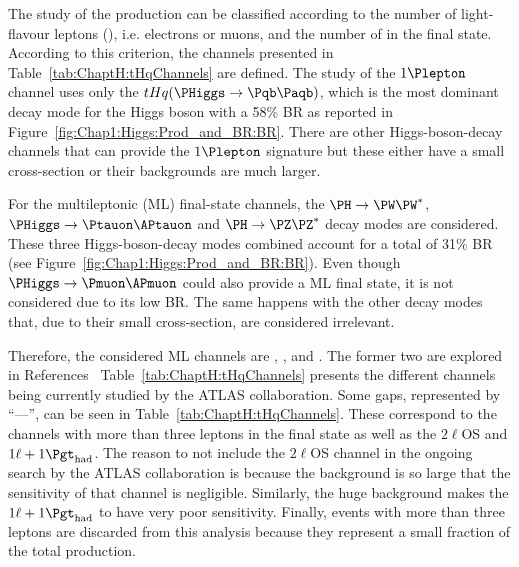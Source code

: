 The study of the \tHq production can be classified according to the number of light-flavour leptons (\Plepton),
i.e. electrons or muons, and the number of \tauhad in the final state. According to this criterion, the
channels presented in Table~\ref{tab:ChaptH:tHqChannels} are defined. 
The study of the $1\Plepton$ channel uses only the $\tHq(\PHiggs \rightarrow \bbbar)$, which is the most dominant
decay mode for the Higgs boson with a 58\% BR as reported in Figure~\ref{fig:Chap1:Higgs:Prod_and_BR:BR}.
There are other Higgs-boson-decay channels that can provide the $1\Plepton$ signature but these either have a small
cross-section or their backgrounds are much larger.

For the multileptonic (ML) final-state channels, the $\HWW$, %
$\PHiggs \rightarrow  \Ptauon \APtauon$ and $\HZZ$ decay modes are considered. 
These three Higgs-boson-decay  
modes combined account for a total of 31\% BR (see Figure~\ref{fig:Chap1:Higgs:Prod_and_BR:BR}).
Even though $\PHiggs \rightarrow \Pmuon\APmuon$ could also provide a ML final state, it is not considered due to its low BR. 
 The same happens with the other decay modes that, due to their small cross-section, are considered irrelevant.
 
Therefore, the considered ML channels are \dilepSS, \trilep, \dileptau and \lepditau. 
The former two are explored in References~\cite{Tariq:2883582, GuerreroRojas:2875564}
Table~\ref{tab:ChaptH:tHqChannels} presents the different channels being currently studied by the ATLAS collaboration.
Some gaps, represented by ``---'', can be seen in Table~\ref{tab:ChaptH:tHqChannels}. These correspond
to the channels with more than three leptons in the final state as well as the $2\ell$OS and $1\ell + 1\tauhad$. 
The reason to not include the $2\ell$OS channel in the ongoing search by the ATLAS collaboration is because the \ttbar
background is so large that the sensitivity of that channel is negligible.  
Similarly, the huge background makes the $1\ell + 1\tauhad$ to have very poor sensitivity.
Finally, events with more than three leptons are discarded from this analysis because 
they represent a small fraction of the total \tHq production.



